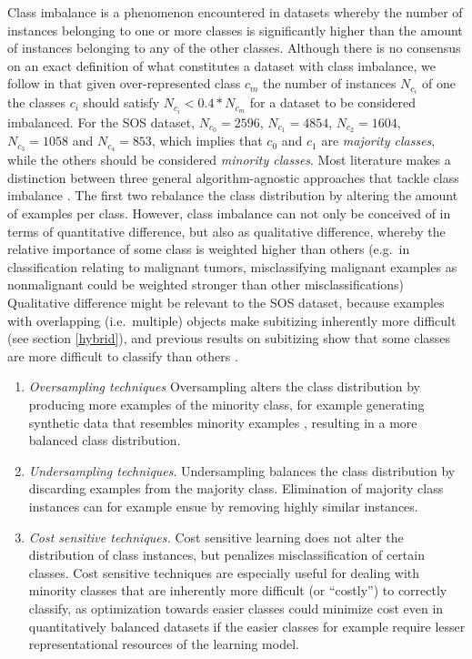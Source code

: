 \documentclass[twocolumn]{article}
\providecommand{\tightlist}{%
  \setlength{\itemsep}{0pt}\setlength{\parskip}{0pt}}
\begin{document}
Class imbalance is a phenomenon encountered in datasets whereby the
number of instances belonging to one or more classes is significantly
higher than the amount of instances belonging to any of the other
classes. Although there is no consensus on an exact definition of what
constitutes a dataset with class imbalance, we follow
\citet{fernandez2013} in that given over-represented class \(c_m\) the
number of instances \(N_{c_i}\) of one the classes \(c_i\) should
satisfy \(N_{c_i} < 0.4 * N_{c_m}\) for a dataset to be considered
imbalanced. For the SOS dataset, \(N_{c_0} = 2596\), \(N_{c_1} = 4854\),
\(N_{c_2} = 1604\), \(N_{c_3} = 1058\) and \(N_{c_4} = 853\), which
implies that \(c_0\) and \(c_1\) are \emph{majority classes}, while the
others should be considered \emph{minority classes}. Most literature
makes a distinction between three general algorithm-agnostic approaches
that tackle class imbalance \citep[for a discussion,
see][]{fernandez2013}. The first two rebalance the class distribution by
altering the amount of examples per class. However, class imbalance can
not only be conceived of in terms of quantitative difference, but also
as qualitative difference, whereby the relative importance of some class
is weighted higher than others (e.g.~in classification relating to
malignant tumors, misclassifying malignant examples as nonmalignant
could be weighted stronger than other misclassifications) Qualitative
difference might be relevant to the SOS dataset, because examples with
overlapping (i.e.~multiple) objects make subitizing inherently more
difficult (see section \ref{hybrid}), and previous results on
subitizing show that some classes are more difficult to classify than
others \citep{zhang2016salient}.

\begin{enumerate}[noitemsep, topsep=0pt]
\def\labelenumi{\arabic{enumi}.}
\tightlist
\item
  \emph{Oversampling techniques} Oversampling alters the class
  distribution by producing more examples of the minority class, for
  example generating synthetic data that resembles minority examples
  \citep[e.g.][]{he2008adasyn, chawla2002smote}, resulting in a more
  balanced class distribution.
\item
  \emph{Undersampling techniques}. Undersampling balances the class
  distribution by discarding examples from the majority class.
  Elimination of majority class instances can for example ensue by
  removing highly similar instances.
  \citep[e.g.][]{tomek1976two}
\item
  \emph{Cost sensitive techniques.} Cost sensitive learning does not
  alter the distribution of class instances, but penalizes
  misclassification of certain classes. Cost sensitive techniques are
  especially useful for dealing with minority classes that are
  inherently more difficult (or ``costly'') to correctly classify, as
  optimization towards easier classes could minimize cost even in
  quantitatively balanced datasets if the easier classes for example
  require lesser representational resources of the learning model.
\end{enumerate}
\end{document}
